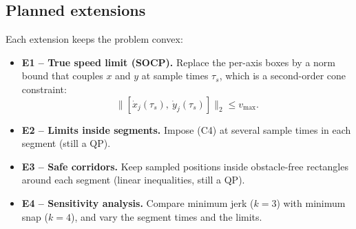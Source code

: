 \subsection{Planned extensions}
Each extension keeps the problem convex:
\begin{itemize}
\item \textbf{E1 -- True speed limit (SOCP).} Replace the per-axis boxes by a norm bound that couples $x$ and $y$ at sample times $\tau_s$, which is a second-order cone constraint:
\begin{equation}
\big\lVert [\dot{x}_j(\tau_s),\ \dot{y}_j(\tau_s)] \big\rVert_2 \le v_{\max}.
\label{eq:soc}
\end{equation}
\item \textbf{E2 -- Limits inside segments.} Impose (C4) at several sample times in each segment (still a QP).
\item \textbf{E3 -- Safe corridors.} Keep sampled positions inside obstacle-free rectangles around each segment (linear inequalities, still a QP).
\item \textbf{E4 -- Sensitivity analysis.} Compare minimum jerk ($k=3$) with minimum snap ($k=4$), and vary the segment times and the limits.
\end{itemize}
